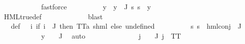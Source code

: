 \begin{isabellebody}
\ \ \ \ \ \ \ \ \ \ \isamarkupfalse%
\ fastforce\isanewline
\ \ \ \ \ \ \ \ \isamarkupfalse%
\ y\ \ {\isachardoublequoteopen}y\ {\isasymin}\ {\isasymPhi}{\isacharbackquote}{\kern0pt}J{\isachardoublequoteclose}\ {\isachardoublequoteopen}{\isacharparenleft}{\kern0pt}{\isasymforall}s{\isachardot}{\kern0pt}\ s\ {\isasymTurnstile}\ y{\isacharparenright}{\kern0pt}{\isachardoublequoteclose}\ \isanewline
\ \ \ \ \ \ \ \ \ \ \isamarkupfalse%
\ {\isachardoublequoteopen}{}{\isachardoublequoteclose}\isanewline
\ \ \ \ \ \ \ \ \ \ \isamarkupfalse%
\ HML{\isacharunderscore}{\kern0pt}true{\isacharunderscore}{\kern0pt}def\ \isanewline
\ \ \ \ \ \ \ \ \ \ \isamarkupfalse%
\ blast\isanewline
\ \ \ \ \ \ \ \ \isamarkupfalse%
\ {\isasymPsi}\ \ {\isasymPsi}{\isacharunderscore}{\kern0pt}def{\isacharcolon}{\kern0pt}\ {\isachardoublequoteopen}{\isasymPsi}\ {\isacharequal}{\kern0pt}\ {\isacharparenleft}{\kern0pt}{\isasymlambda}i{\isachardot}{\kern0pt}\ {\isacharparenleft}{\kern0pt}if\ i\ {\isasymin}\ J\ then\ {\isacharparenleft}{\kern0pt}TT{\isacharcolon}{\kern0pt}{\isacharcolon}{\kern0pt}{\isacharparenleft}{\kern0pt}{\isacharprime}{\kern0pt}a{\isacharcomma}{\kern0pt}\ {\isacharprime}{\kern0pt}s{\isacharparenright}{\kern0pt}hml{\isacharparenright}{\kern0pt}\ else\ undefined{\isacharparenright}{\kern0pt}{\isacharparenright}{\kern0pt}{\isachardoublequoteclose}\isanewline
\ \ \ \ \ \ \ \ \isamarkupfalse%
\ {\isachardoublequoteopen}{\isasymforall}s{\isachardot}{\kern0pt}\ {\isasymnot}s\ {\isasymTurnstile}\ {\isacharparenleft}{\kern0pt}hml{\isacharunderscore}{\kern0pt}conj\ {\isacharbraceleft}{\kern0pt}{\isacharbraceright}{\kern0pt}\ J\ {\isasymPsi}{\isacharparenright}{\kern0pt}{\isachardoublequoteclose}\ \isanewline
\ \ \ \ \ \ \ \ \ \ \isamarkupfalse%
\ {\isacartoucheopen}y\ {\isasymin}\ {\isasymPhi}\ {\isacharbackquote}{\kern0pt}\ J{\isacartoucheclose}\ \isamarkupfalse%
\ auto\isanewline
\ \ \ \ \ \ \ \ \isamarkupfalse%
\ {\isachardoublequoteopen}{\isasymPsi}\ {\isacharbackquote}{\kern0pt}\ {\isacharbraceleft}{\kern0pt}{\isacharbraceright}{\kern0pt}\ {\isacharequal}{\kern0pt}\ {\isacharbraceleft}{\kern0pt}{\isacharbraceright}{\kern0pt}{\isachardoublequoteclose}\ {\isachardoublequoteopen}{\isasymforall}j\ {\isasymin}\ {\isasymPsi}\ {\isacharbackquote}{\kern0pt}\ J{\isachardot}{\kern0pt}\ j\ {\isacharequal}{\kern0pt}\ TT{\isachardoublequoteclose}\ \isanewline
\ \ \ \ \ \ \ \ \ \ \ \isamarkupfalse%

\end{isabellebody}
